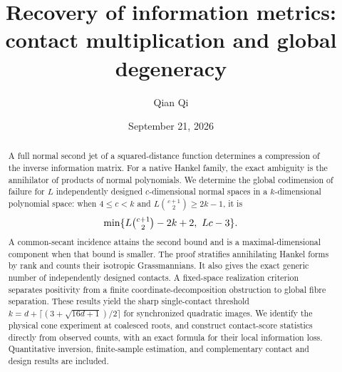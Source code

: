 \documentclass[11pt,reqno]{amsart}
\title[Contact multiplication and global degeneracy]{Recovery of information metrics:\\contact multiplication and global degeneracy}
\author{Qian Qi}
\date{September 21, 2026}
\numberwithin{equation}{section}
\theoremstyle{definition}\newtheorem{definition}[theorem]{Definition}
\theoremstyle{remark}\newtheorem{remark}[theorem]{Remark}
\begin{document}
\begin{abstract}
A full normal second jet of a squared-distance function determines a compression of the inverse information matrix. For a native Hankel family, the exact ambiguity is the annihilator of products of normal polynomials. We determine the global codimension of failure for $L$ independently designed $c$-dimensional normal spaces in a $k$-dimensional polynomial space: when $4\le c<k$ and $L\binom{c+1}{2}\ge2k-1$, it is
\[
 \min\{L\tbinom{c+1}{2}-2k+2,\ Lc-3\}.
\]
A common-secant incidence attains the second bound and is a maximal-dimensional component when that bound is smaller. The proof stratifies annihilating Hankel forms by rank and counts their isotropic Grassmannians. It also gives the exact generic number of independently designed contacts. A fixed-space realization criterion separates positivity from a finite coordinate-decomposition obstruction to global fibre separation. These results yield the sharp single-contact threshold $k=d+\lceil(3+\sqrt{16d+1})/2\rceil$ for synchronized quadratic images. We identify the physical cone experiment at coalesced roots, and construct contact-score statistics directly from observed counts, with an exact formula for their local information loss. Quantitative inversion, finite-sample estimation, and complementary contact and design results are included.
\end{abstract}
\maketitle




\appendix


\end{document}
